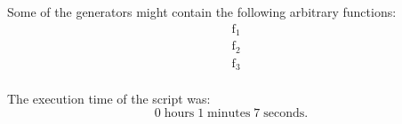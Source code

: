 \noindent Some of the generators might contain the following arbitrary functions:
\begin{align*}
&\operatorname{f_{1}}\\
&\operatorname{f_{2}}\\
&\operatorname{f_{3}}\\
\end{align*}

\noindent The execution time of the script was:
$$0\;\mathrm{hours}\;1\;\mathrm{minutes}\;7 \;\mathrm{seconds}.$$
